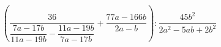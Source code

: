 \begin{ex}[type=simplify_calculate]
	\begin{condition}
		\(\left( \dfrac{36}{\dfrac{7a-17b}{11a-19b}-\dfrac{11a-19b}{7a-17b}}+\dfrac{77a-166b}{2a-b} \right):\dfrac{45b^2}{2a^2-5ab+2b^2}\)
	\end{condition}
\end{ex}